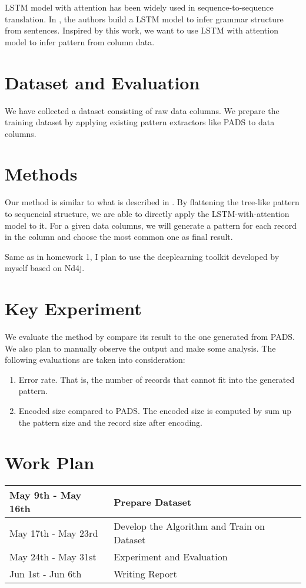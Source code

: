 \documentclass{article}
\begin{document}
LSTM model with attention has been widely used in sequence-to-sequence
translation. In \cite{grammar_2014}, the authors build a LSTM model to infer grammar
structure from sentences. Inspired by this work, we want to use LSTM with
attention model to infer pattern from column data.

\section{Dataset and Evaluation}
We have collected a dataset consisting of raw data columns. We prepare
the training dataset by applying existing pattern extractors like
PADS\cite{pads_2008} to data columns.

\section{Methods}

Our method is similar to what is described in \cite{grammar_2014}. By flattening
the tree-like pattern to sequencial structure, we are able to directly apply the
LSTM-with-attention model to it. For a given data columns, we will generate a
pattern for each record in the column and choose the most common one as final result.

Same as in homework 1, I plan to use the deeplearning toolkit developed by
myself based on Nd4j. 
\section{Key Experiment}
We evaluate the method by compare its result to the one generated from PADS.
We also plan to manually observe the output and make some analysis. The
following evaluations are taken into consideration:
\begin{enumerate}
  \item Error rate. That is, the number of records that cannot fit into the
  generated pattern.
  \item Encoded size compared to PADS. The encoded size is computed by sum up
  the pattern size and the record size after encoding.
\end{enumerate}

\section{Work Plan}
\begin{tabular}{l|l}
May 9th - May 16th & Prepare Dataset\\
\hline
May 17th - May 23rd & Develop the Algorithm and Train on Dataset\\
\hline
May 24th - May 31st & Experiment and Evaluation \\
\hline
Jun 1st - Jun 6th & Writing Report
\end{tabular}



\end{document}
